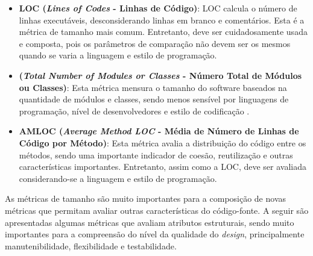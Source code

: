 %

\begin{itemize}
\item \textbf{LOC (\emph{Lines of Codes} - Linhas de Código)}: LOC calcula o número de linhas executáveis, desconsiderando linhas em branco e comentários. Esta é a métrica de tamanho mais comum. Entretanto, deve ser cuidadosamente usada e composta, pois os parâmetros de comparação não devem ser os mesmos quando se varia a linguagem e estilo de programação.
\item \textbf{(\emph{Total Number of Modules or Classes} - Número Total de Módulos ou Classes)}: Esta métrica mensura o tamanho do software baseados na quantidade de módulos e classes, sendo menos sensível por linguagens de programação, nível de desenvolvedores e estilo de codificação \cite{meirelles2013metrics}.
\item \textbf{AMLOC (\emph{Average Method LOC} - Média de Número de Linhas de Código por Método)}: Esta métrica avalia a distribuição do código entre os métodos, sendo uma importante indicador de coesão, reutilização e outras características importantes. Entretanto, assim como a LOC, deve ser avaliada considerando-se a linguagem e estilo de programação.
\end{itemize}

%

As métricas de tamanho são muito importantes para a composição de novas métricas que permitam avaliar outras características do código-fonte. A seguir são apresentadas algumas métricas que avaliam atributos estruturais, sendo muito importantes para a compreensão do nível da qualidade do \emph{design}, principalmente manutenibilidade, flexibilidade e testabilidade.

%

